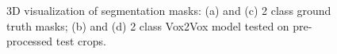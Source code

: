 \begin{figure}[!htb]
\centering
{}\hfil
{}

\hfil 
{}

\caption{3D visualization of segmentation masks: (a) and (c) 2 class ground truth masks; (b) and (d) 2 class Vox2Vox model tested on pre-processed test crops.}

\label{fig:results-vox2vox-2channel}

\end{figure}

